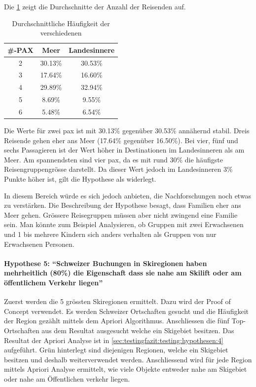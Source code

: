 Die \cref{sec:testingfazit:testing:hypothesen:3:2} zeigt die Durchschnitte der Anzahl der Reisenden auf.
\begin{table}[H] 
	\caption{Durchschnittliche Häufigkeit der verschiedenen }
	\centering
	\label{sec:testingfazit:testing:hypothesen:3:2}
	\begin{tabular}{ | c | c | c | } 
		\hline 
		\rowcolor{tableheadcolor}
		\bfseries \#-PAX & \bfseries Meer & \bfseries Landesinnere \\ \hline 		
		2 & 30.13\% & 30.53\% \\ \hline
		3 & 17.64\% & 16.60\% \\ \hline
		4 & 29.89\% & 32.94\% \\ \hline
		5 & 8.69\% & 9.55\% \\ \hline
		6 & 5.48\% & 6.54\% \\ \hline
	\end{tabular}
\end{table}

Die Werte für zwei \gls{pax} ist mit 30.13\% gegenüber 30.53\% annähernd stabil. Dreis Reisende gehen eher ans Meer (17.64\% gegenüber 16.50\%). Bei vier, fünf und sechs Passagieren ist der Wert höher in Destinationen im Landesinneren als am Meer. Am spannendsten sind vier \gls{pax}, da es mit rund 30\% die häufigste Reisengruppengrösse darstellt. Da dieser Wert jedoch im Landesinneren 3\% Punkte höher ist, gilt die Hypothese als widerlegt.

In diesem Bereich würde es sich jedoch anbieten, die Nachforschungen noch etwas zu verstärken. Die Beschreibung der Hypothese besagt, dass Familien eher ans Meer gehen. Grössere Reisegruppen müssen aber nicht zwingend eine Familie sein. Man könnte zum Beispiel Analysieren, ob Gruppen mit zwei Erwachsenen und 1 bis mehrere Kindern sich anders verhalten als Gruppen von nur Erwachsenen Personen.

\paragraph{Hypothese 5: "`Schweizer Buchungen in Skiregionen haben mehrheitlich (80\%) die Eigenschaft dass sie nahe am Skilift oder am öffentlichem Verkehr liegen"'} Zuerst werden die 5 grössten Skiregionen ermittelt. Dazu wird der Proof of Concept verwendet. Es werden Schweizer Ortschaften gesucht und die Häufigkeit der Region gezählt mittels dem Apriori Algorithmus. Anschliessen die fünf Top-Ortschaften aus dem Resultat ausgesucht welche ein Skigebiet besitzen. Das Resultat der Apriori Analyse ist in \cref{sec:testingfazit:testing:hypothesen:4} aufgeführt. \colorbox{green!25}{Grün} hinterlegt sind diejenigen Regionen, welche ein Skigebiet besitzen und deshalb weiterverwendet werden. Anschliessend wird für jede Region mittels Apriori Analyse ermittelt, wie viele Objekte entweder nahe am Skigebiet oder nahe am Öffentlichen verkehr liegen. 

